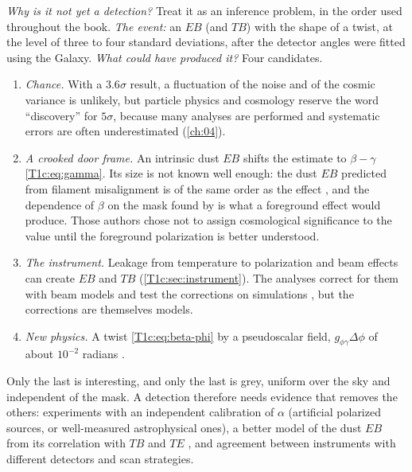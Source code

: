 \emph{Why is it not yet a detection?} Treat it as an inference problem, in the order used throughout the book. \emph{The event:} an $EB$ (and $TB$) with the shape of a twist, at the level of three to four standard deviations, after the detector angles were fitted using the Galaxy. \emph{What could have produced it?} Four candidates.
\begin{enumerate}[leftmargin=1.6em,itemsep=2pt]
\item \emph{Chance.} With a $3.6\sigma$ result, a fluctuation of the noise and of the cosmic variance is unlikely, but particle physics and cosmology reserve the word ``discovery'' for $5\sigma$, because many analyses are performed and systematic errors are often underestimated (\cref{ch:04}).
\item \emph{A crooked door frame.} An intrinsic dust $EB$ shifts the estimate to $\beta-\gamma$ \eqref{T1c:eq:gamma}. Its size is not known well enough: the dust $EB$ predicted from filament misalignment is of the same order as the effect \cite{Clark2021}, and the dependence of $\beta$ on the mask found by \cite{DiegoPalazuelos2022} is what a foreground effect would produce. Those authors chose not to assign cosmological significance to the value until the foreground polarization is better understood.
\item \emph{The instrument.} Leakage from temperature to polarization and beam effects can create $EB$ and $TB$ (\cref{T1c:sec:instrument}). The analyses correct for them with beam models and test the corrections on simulations \cite{MinamiKomatsu2020}, but the corrections are themselves models.
\item \emph{New physics.} A twist \eqref{T1c:eq:beta-phi} by a pseudoscalar field, $g_{\phi\gamma}\Delta\phi$ of about $10^{-2}$ radians \cite{MinamiKomatsu2020}.
\end{enumerate}
Only the last is interesting, and only the last is grey, uniform over the sky and independent of the mask. A detection therefore needs evidence that removes the others: experiments with an independent calibration of $\alpha$ (artificial polarized sources, or well-measured astrophysical ones), a better model of the dust $EB$ from its correlation with $TB$ and $TE$ \cite{Clark2021}, and agreement between instruments with different detectors and scan strategies.

